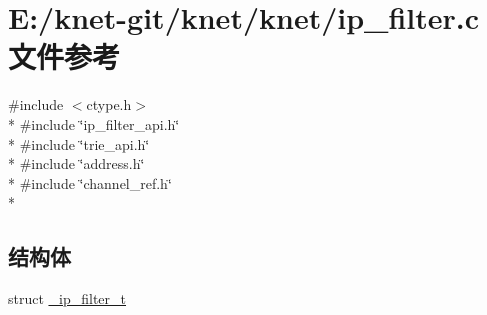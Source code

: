 \hypertarget{a00079}{}\section{E\+:/knet-\/git/knet/knet/ip\+\_\+filter.c 文件参考}
\label{a00079}
{\ttfamily \#include $<$ctype.\+h$>$}\\*
{\ttfamily \#include \char`\"{}ip\+\_\+filter\+\_\+api.\+h\char`\"{}}\\*
{\ttfamily \#include \char`\"{}trie\+\_\+api.\+h\char`\"{}}\\*
{\ttfamily \#include \char`\"{}address.\+h\char`\"{}}\\*
{\ttfamily \#include \char`\"{}channel\+\_\+ref.\+h\char`\"{}}\\*
\subsection*{结构体}
\begin{DoxyCompactItemize}
\item 
struct \hyperlink{a00017}{\+\_\+ip\+\_\+filter\+\_\+t}
\end{DoxyCompactItemize}
